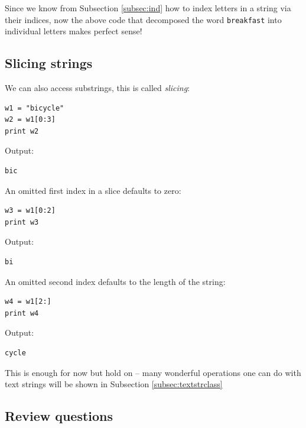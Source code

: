 Since we know from Subsection \ref{subsec:ind} 
how to index letters in a string via their indices, now the above 
code that decomposed the word {\tt breakfast} into individual letters
makes perfect sense!

\subsection{Slicing strings}

We can also access substrings, this is called {\em slicing}:

\begin{verbatim}
w1 = "bicycle"
w2 = w1[0:3]
print w2
\end{verbatim}
Output:

\begin{verbatim}
bic
\end{verbatim}
An omitted first index in a slice defaults to zero:

\begin{verbatim}
w3 = w1[0:2]
print w3
\end{verbatim}
Output:

\begin{verbatim}
bi
\end{verbatim}
An omitted second index defaults to the length of the string:

\begin{verbatim}
w4 = w1[2:]
print w4
\end{verbatim}
Output:

\begin{verbatim}
cycle
\end{verbatim}
This is enough for now but hold on -- many wonderful operations one 
can do with text strings will be shown in Subsection \ref{subsec:textstrclass}

\subsection{Review questions}

